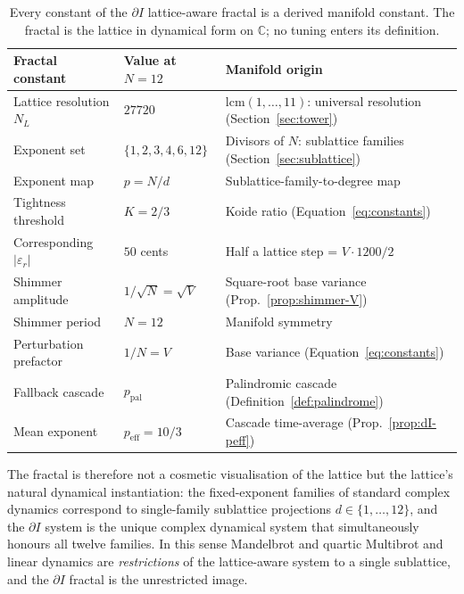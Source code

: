 \documentclass[11pt,a4paper]{article}
\theoremstyle{definition}
\theoremstyle{remark}
\newcommand{\C}{\mathbb{C}}
\begin{document}
\begin{table}[h]
\centering
\begin{tabular}{@{}l l l@{}}
\toprule
Fractal constant & Value at $N=12$ & Manifold origin\\
\midrule
Lattice resolution $N_{L}$ & $27720$ & $\mathrm{lcm}(1,\ldots,11)$: universal resolution (Section~\ref{sec:tower})\\
Exponent set & $\{1,2,3,4,6,12\}$ & Divisors of $N$: sublattice families (Section~\ref{sec:sublattice})\\
Exponent map & $p = N/d$ & Sublattice-family-to-degree map\\
Tightness threshold & $K = 2/3$ & Koide ratio (Equation~\eqref{eq:constants})\\
Corresponding $|\varepsilon_{r}|$ & $50$ cents & Half a lattice step = $V\cdot 1200/2$\\
Shimmer amplitude & $1/\sqrt{N} = \sqrt{V}$ & Square-root base variance (Prop.~\ref{prop:shimmer-V})\\
Shimmer period & $N=12$ & Manifold symmetry\\
Perturbation prefactor & $1/N = V$ & Base variance (Equation~\eqref{eq:constants})\\
Fallback cascade & $p_{\mathrm{pal}}$ & Palindromic cascade (Definition~\ref{def:palindrome})\\
Mean exponent & $p_{\mathrm{eff}} = 10/3$ & Cascade time-average (Prop.~\ref{prop:dI-peff})\\
\bottomrule
\end{tabular}
\caption{Every constant of the $\partial I$ lattice-aware fractal is a derived manifold constant. The fractal is the lattice in dynamical form on $\C$; no tuning enters its definition.}
\label{tab:fractal-constants}
\end{table}

The fractal is therefore not a cosmetic visualisation of the lattice but the lattice's natural dynamical instantiation: the fixed-exponent families of standard complex dynamics correspond to single-family sublattice projections $d\in\{1,\ldots,12\}$, and the $\partial I$ system is the unique complex dynamical system that simultaneously honours all twelve families. In this sense Mandelbrot and quartic Multibrot and linear dynamics are \emph{restrictions} of the lattice-aware system to a single sublattice, and the $\partial I$ fractal is the unrestricted image.
\end{document}
